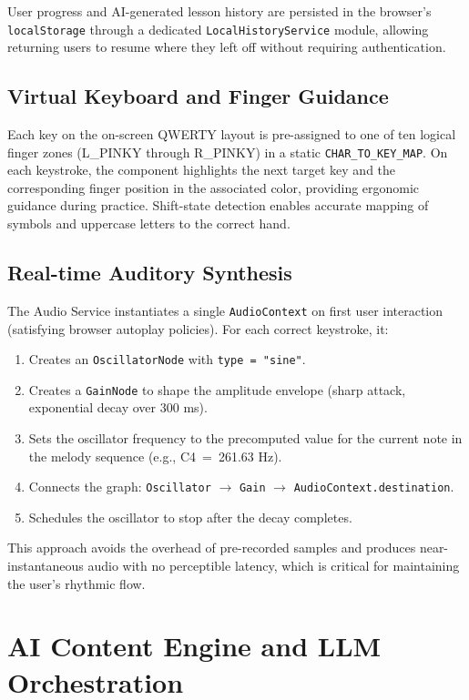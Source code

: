 \documentclass[conference]{IEEEtran}
\begin{document}
User progress and AI-generated lesson history are persisted in the
browser's \texttt{localStorage} through a dedicated
\texttt{LocalHistoryService} module, allowing returning users to
resume where they left off without requiring authentication.

\subsection{Virtual Keyboard and Finger Guidance}

Each key on the on-screen QWERTY layout is pre-assigned to one of ten
logical finger zones (L\_PINKY through R\_PINKY) in a static
\texttt{CHAR\_TO\_KEY\_MAP}. On each keystroke, the component
highlights the next target key and the corresponding finger position
in the associated color, providing ergonomic guidance during practice.
Shift-state detection enables accurate mapping of symbols and
uppercase letters to the correct hand.

\subsection{Real-time Auditory Synthesis}

The Audio Service instantiates a single \texttt{AudioContext} on
first user interaction (satisfying browser autoplay policies). For
each correct keystroke, it:
\begin{enumerate}
  \item Creates an \texttt{OscillatorNode} with \texttt{type = "sine"}.
  \item Creates a \texttt{GainNode} to shape the amplitude envelope
        (sharp attack, exponential decay over 300 ms).
  \item Sets the oscillator frequency to the precomputed value for
        the current note in the melody sequence (e.g., C4~=~261.63 Hz).
  \item Connects the graph: \texttt{Oscillator} $\rightarrow$
        \texttt{Gain} $\rightarrow$ \texttt{AudioContext.destination}.
  \item Schedules the oscillator to stop after the decay completes.
\end{enumerate}
This approach avoids the overhead of pre-recorded samples and produces
near-instantaneous audio with no perceptible latency, which is
critical for maintaining the user's rhythmic flow.

\section{AI Content Engine and LLM Orchestration}
\end{document}
